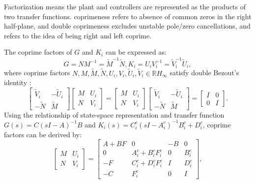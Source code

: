 \documentclass[a4paper,fleqn]{cas-sc}
\begin{document}
Factorization means the plant and controllers are represented as the products of two transfer functions. coprimeness refers to absence of common zeros in the right half-plane, and double coprimeness excludes unstable pole/zero cancellations, and refers to the idea of being right and left coprime.

The coprime factors of $G$ and $K_i$ can be expressed as:
\begin{equation}
  G=N M^{-1}=\tilde{M}^{-1} \tilde{N}, K_{i}=U_{i} V_{i}^{-1}=\tilde{V}_{i}^{-1} \tilde{U}_{i},
\end{equation}
where coprime factors $N, M, \tilde{M}, \tilde{N}, U_{i}, V_{i}, \tilde{U}_{i}, \tilde{V}_{i} \in \mathbb{R} H_{\infty}$ satisfy double Bezout's identity \citep{pommaret1998generalized}:
\begin{equation}
  \left[\begin{array}{cc}
      \tilde{V}_{i} & -\tilde{U}_{i} \\
      -\tilde{N}    & \tilde{M}
    \end{array}\right]\left[\begin{array}{cc}
      M & U_{i} \\
      N & V_{i}
    \end{array}\right]=\left[\begin{array}{cc}
      M & U_{i} \\
      N & V_{i}
    \end{array}\right]\left[\begin{array}{cc}
      \tilde{V}_{i} & -\tilde{U}_{i} \\
      -\tilde{N}    & \tilde{M}
    \end{array}\right]=\left[\begin{array}{cc}
      I & 0 \\
      0 & I
    \end{array}\right].
  \label{Eq16}
\end{equation}
Using the relationship of state-space representation and transfer function $G(s)=C(sI-A)^{-1} B$ and $K_i (s)=C_i^c (sI-A_i^c)^{-1} B_i^c+D_i^c$, coprime factors can be derived by:
\begin{equation}
  \left[\begin{array}{cc}
      M & U_{i} \\
      N & V_{i}
    \end{array}\right]=\left[\begin{array}{cc|cc}
      A+B F     & 0                             & -B & 0         \\
      0         & A_{i}^{c}+B_{i}^{c} F_{i}^{c} & 0  & B_{i}^{c} \\
      \hline -F & C_{i}^{c}+D_{i}^{c} F_{i}^{c} & I  & D_{i}^{c} \\
      -C        & F_{i}^{c}                     & 0  & I
    \end{array}\right],
  \label{Eq17}
\end{equation}
\end{document}
